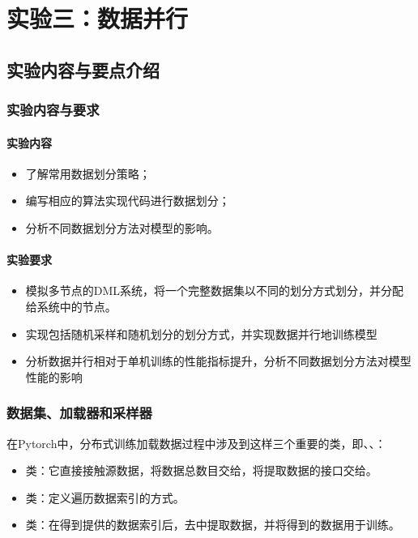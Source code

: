 \chapter{实验三：数据并行}

\section{实验内容与要点介绍}

\subsection{实验内容与要求}

\subsubsection{实验内容}
\begin{itemize}
    \item 了解常用数据划分策略；
    \item 编写相应的算法实现代码进行数据划分；
    \item 分析不同数据划分方法对模型的影响。
\end{itemize}


\subsubsection{实验要求}
\begin{itemize}
    \item 模拟多节点的DML系统，将一个完整数据集以不同的划分方式划分，并分配给系统中的节点。
    \item 实现包括随机采样和随机划分的划分方式，并实现数据并行地训练模型
    \item 分析数据并行相对于单机训练的性能指标提升，分析不同数据划分方法对模型性能的影响
\end{itemize}


\subsection{数据集、加载器和采样器}

在Pytorch中，分布式训练加载数据过程中涉及到这样三个重要的类，即、、：
\begin{itemize}
    \item {}类：它直接接触源数据，将数据总数目交给，将提取数据的接口交给。
    \item {}类：定义遍历数据索引的方式。
    \item {}类：在得到提供的数据索引后，去中提取数据，并将得到的数据用于训练。
\end{itemize}

